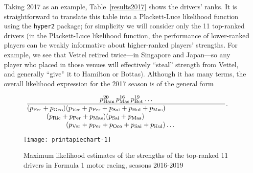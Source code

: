 \documentclass{elsarticle}
\begin{document}
Taking 2017 as an example, Table~\ref{results2017} shows the drivers'
ranks.  It is straightforward to translate this table into a
Plackett-Luce likelihood function using the \texttt{hyper2} package;
for simplicity we will consider only the 11 top-ranked drivers (in the
Plackett-Luce likelihood function, the performance of lower-ranked
players can be weakly informative about higher-ranked players'
strengths.  For example, we see that Vettel retired twice---in
Singapore and Japan---so any player who placed in those venues will
effectively ``steal'' strength from Vettel, and generally ``give'' it
to Hamilton or Bottas).  Although it has many terms, the overall
likelihood expression for the 2017 season is of the general form

\newcommand{\pham}{p_\mathrm{Ham}}
\newcommand{\pvet}{p_\mathrm{Vet}}
\newcommand{\pbot}{p_\mathrm{Bot}}
\newcommand{\prai}{p_\mathrm{Rai}}
\newcommand{\pric}{p_\mathrm{Ric}}
\newcommand{\pver}{p_\mathrm{Ver}}
\newcommand{\pper}{p_\mathrm{Per}}
\newcommand{\poco}{p_\mathrm{Oco}}
\newcommand{\psai}{p_\mathrm{Sai}}
\newcommand{\phul}{p_\mathrm{H\"{u}l}}
\newcommand{\pmas}{p_\mathrm{Mas}}

\begin{equation}
\frac{p_\mathrm{Ham}^{20}\,p_\mathrm{Mas}^{16}\,p_\mathrm{Bot}^{19}\ldots
}{\parbox{4in}{$(p_\mathrm{Per}+p_\mathrm{Oco})(p_\mathrm{Ver}+p_\mathrm{Per}+p_\mathrm{Sai}+p_\mathrm{Hul}+p_\mathrm{Mas})\\
    \rule{10mm}{0mm}(p_\mathrm{Ric}+p_\mathrm{Per}+p_\mathrm{Mas})(p_\mathrm{Sai}+p_\mathrm{Mas})\\ \rule{20mm}{0mm}
    (p_\mathrm{Ver}+ p_\mathrm{Per}+ p_\mathrm{Oco}+ p_\mathrm{Sai}+ p_\mathrm{Hul})\ldots
     $}}.
 \end{equation}

\begin{figure}
{\centering \texttt{[image: printapiechart-1]}}
\caption[\doublespacing Maximum likelihood estimates \label{piechartstrength} of the
  strengths of the top-ranked 11 drivers in Formula 1 motor racing,
  seasons 2016-2019]{\doublespacing Maximum likelihood
  estimates \label{piechartstrength} of the strengths of the
  top-ranked 11 drivers in Formula 1 motor racing, seasons
  2016-2019}\label{fig:printapiechart}
\end{figure}
\end{document}
